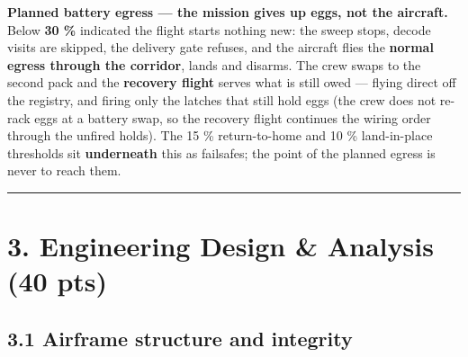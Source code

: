 \documentclass[
  10pt,
  a4paper,
  titlepage]{article}
\begin{document}
\textbf{Planned battery egress --- the mission gives up eggs, not the
aircraft.} Below \textbf{30 \%} indicated the flight starts nothing new:
the sweep stops, decode visits are skipped, the delivery gate refuses,
and the aircraft flies the \textbf{normal egress through the corridor},
lands and disarms. The crew swaps to the second pack and the
\textbf{recovery flight} serves what is still owed --- flying direct off
the registry, and firing only the latches that still hold eggs (the crew
does not re-rack eggs at a battery swap, so the recovery flight
continues the wiring order through the unfired holds). The 15 \%
return-to-home and 10 \% land-in-place thresholds sit
\textbf{underneath} this as failsafes; the point of the planned egress
is never to reach them.

\begin{center}\rule{0.5\linewidth}{0.5pt}\end{center}

\hypertarget{engineering-design-analysis-40-pts}{%
\section{3. Engineering Design \& Analysis (40
pts)}\label{engineering-design-analysis-40-pts}}

\hypertarget{airframe-structure-and-integrity}{%
\subsection{3.1 Airframe structure and
integrity}\label{airframe-structure-and-integrity}}
\end{document}
